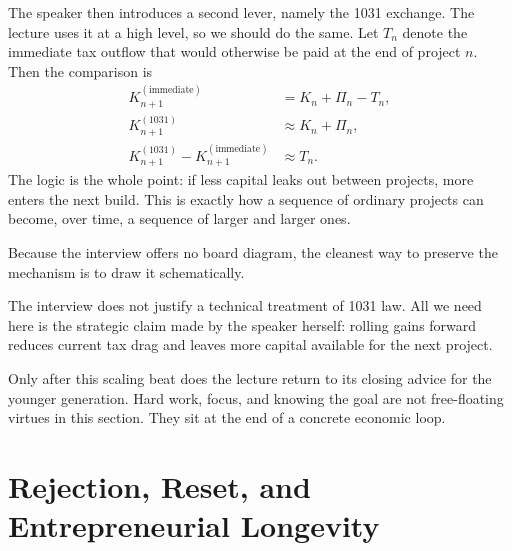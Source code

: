 The speaker then introduces a second lever, namely the 1031 exchange. The lecture uses it at a high level, so we should do the same. Let \(T_n\) denote the immediate tax outflow that would otherwise be paid at the end of project \(n\). Then the comparison is
\begin{align}
K_{n+1}^{(\text{immediate})} &= K_n + \Pi_n - T_n,\\
K_{n+1}^{(\text{1031})} &\approx K_n + \Pi_n,\\
K_{n+1}^{(\text{1031})} - K_{n+1}^{(\text{immediate})} &\approx T_n.
\end{align}
The logic is the whole point: if less capital leaks out between projects, more enters the next build. This is exactly how a sequence of ordinary projects can become, over time, a sequence of larger and larger ones.

Because the interview offers no board diagram, the cleanest way to preserve the mechanism is to draw it schematically.

\begin{figure}
\centering
{}
\end{figure}

\begin{remark}
The interview does not justify a technical treatment of 1031 law. All we need here is the strategic claim made by the speaker herself: rolling gains forward reduces current tax drag and leaves more capital available for the next project.
\end{remark}

Only after this scaling beat does the lecture return to its closing advice for the younger generation. Hard work, focus, and knowing the goal are not free-floating virtues in this section. They sit at the end of a concrete economic loop.

\section{Rejection, Reset, and Entrepreneurial Longevity}


